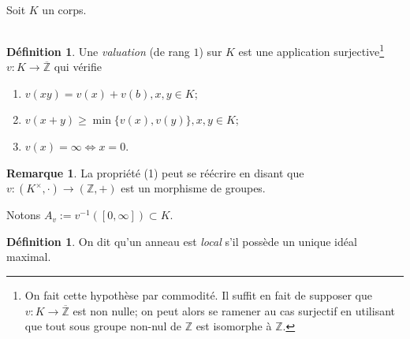 \documentclass[a4paper, oneside, 12pt]{book}
\theoremstyle{definition} %
\newtheorem{definition}[theoreme]{Définition}
\newtheorem{remarque}[theoreme]{Remarque}
\newcommand{\Z}{\mathbb{Z}}
\begin{document}
   Soit $K$ un corps.

\subsection{}

\begin{definition}\label{ValDef}
  Une \textit{valuation} (de rang $1$) sur $K$ est une application surjective\footnote{On fait cette hypothèse par commodité. Il suffit en fait de supposer que $v:K\rightarrow \overline{\Z}$ est non nulle; on peut alors se ramener au cas surjectif en utilisant que  tout sous groupe non-nul de $\Z$ est isomorphe à $\Z$.}
  $v:K\rightarrow \overline{\Z}$  qui vérifie
  \begin{enumerate}
  \item $v(xy)=v (x)+v (b), x,y\in K$;
  \item $v(x+y)\geq \min\{v(x),v(y)\}, x,y\in K$;
  \item $v(x)=\infty \iff x=0$.
  \end{enumerate}
\end{definition}

\begin{remarque}
La propriété (1) peut se réécrire en disant que $v:(K^\times,\cdot)\rightarrow (\Z,+)$ est un morphisme de groupes.
\end{remarque}

Notons $A_v:=v^{-1}([0,\infty])\subset K$.

\begin{definition}
On dit qu'un anneau est \textit{local} s'il possède un unique idéal maximal.
\end{definition}
\end{document}
